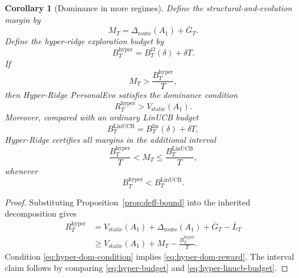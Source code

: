 \documentclass{article} %
\newtheorem{corollary}[theorem]{Corollary}
\begin{document}
\begin{corollary}[Dominance in more regimes]
\label{cor:hyper-dominance}
Define the structural-and-evolution margin by
\begin{equation}
\label{eq:hyper-margin}
M_T
=
\Delta_{\mathrm{route}}(A_1)+\bar G_T.
\end{equation}
Define the hyper-ridge exploration budget by
\begin{equation}
\label{eq:hyper-budget}
B_T^{\mathrm{hyper}}
=
B_T^\Omega(\delta)+\delta T.
\end{equation}
If
\begin{equation}
\label{eq:hyper-dom-condition}
M_T
>
\frac{B_T^{\mathrm{hyper}}}{T},
\end{equation}
then Hyper-Ridge PersonalEvo satisfies the dominance condition
\begin{equation}
\label{eq:hyper-dom-reward}
R_T^{\mathrm{hyper}}
>
V_{\mathrm{static}}(A_1).
\end{equation}
Moreover, compared with an ordinary LinUCB budget
\begin{equation}
\label{eq:hyper-linucb-budget}
B_T^{\mathrm{LinUCB}}
=
B_T^{\mathrm{lin}}(\delta)+\delta T,
\end{equation}
Hyper-Ridge certifies all margins in the additional interval
\begin{equation}
\label{eq:hyper-new-regime}
\frac{B_T^{\mathrm{hyper}}}{T}
<
M_T
\le
\frac{B_T^{\mathrm{LinUCB}}}{T},
\end{equation}
whenever
\begin{equation}
\label{eq:hyper-budget-order}
B_T^{\mathrm{hyper}}
<
B_T^{\mathrm{LinUCB}}.
\end{equation}
\end{corollary}

\begin{proof}
Substituting Proposition~\ref{prop:deff-bound} into the inherited decomposition gives
\begin{align}
R_T^{\mathrm{hyper}}
&=
V_{\mathrm{static}}(A_1)
+
\Delta_{\mathrm{route}}(A_1)
+
\bar G_T
-
\bar L_T
\nonumber\\
&\ge
V_{\mathrm{static}}(A_1)
+
M_T
-
\frac{B_T^{\mathrm{hyper}}}{T}.
\label{eq:hyper-cor-proof}
\end{align}
Condition \eqref{eq:hyper-dom-condition} implies \eqref{eq:hyper-dom-reward}. The interval claim follows by comparing \eqref{eq:hyper-budget} and \eqref{eq:hyper-linucb-budget}.
\end{proof}
\end{document}
